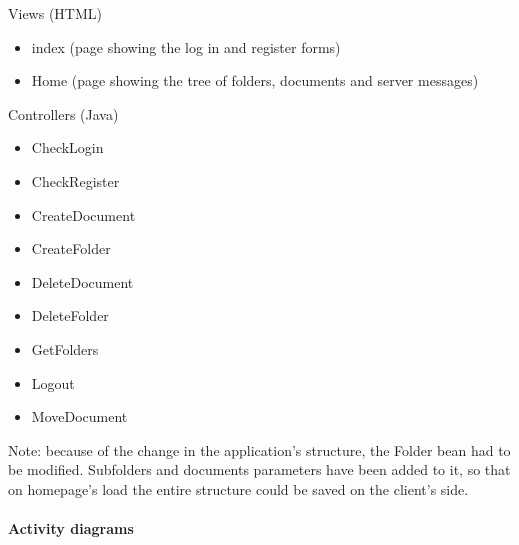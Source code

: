 \documentclass[a4paper,12pt]{article}
\begin{document}
\begin{multicols}{2}
\begin{itemize}
\end{itemize}
Views (HTML)
\begin{itemize}
	\item{index (page showing the log in and register forms)}
	\item{Home (page showing the tree of folders, documents and server messages)}
\end{itemize}
Controllers (Java)
\begin{itemize}
	\item{CheckLogin}
	\item{CheckRegister}
	\item{CreateDocument}
	\item{CreateFolder}
	\item{DeleteDocument}
	\item{DeleteFolder}
	\item{GetFolders}
	\item{Logout}
	\item{MoveDocument}
\end{itemize}
\end{multicols}
Note: because of the change in the application's structure, the Folder bean had to be modified. Subfolders and documents parameters have been added to it, so that on homepage's load the entire structure could be saved on the client's side.
\newpage 

\paragraph{Activity diagrams}\mbox{}
\end{document}
